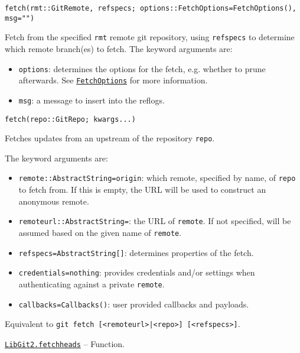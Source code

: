 \begin{adjustwidth}{2em}{0pt}


\begin{verbatim}
fetch(rmt::GitRemote, refspecs; options::FetchOptions=FetchOptions(), msg="")
\end{verbatim}

Fetch from the specified \texttt{rmt} remote git repository, using \texttt{refspecs} to determine which remote branch(es) to fetch. The keyword arguments are:

\begin{itemize}
\item \texttt{options}: determines the options for the fetch, e.g. whether to prune afterwards. See \hyperlink{7474664468985945267}{\texttt{FetchOptions}} for more information.


\item \texttt{msg}: a message to insert into the reflogs.

\end{itemize}



\begin{lstlisting}
fetch(repo::GitRepo; kwargs...)
\end{lstlisting}

Fetches updates from an upstream of the repository \texttt{repo}.

The keyword arguments are:

\begin{itemize}
\item \texttt{remote::AbstractString={\textquotedbl}origin{\textquotedbl}}: which remote, specified by name, of \texttt{repo} to fetch from. If this is empty, the URL will be used to construct an anonymous remote.


\item \texttt{remoteurl::AbstractString={\textquotedbl}{\textquotedbl}}: the URL of \texttt{remote}. If not specified, will be assumed based on the given name of \texttt{remote}.


\item \texttt{refspecs=AbstractString[]}: determines properties of the fetch.


\item \texttt{credentials=nothing}: provides credentials and/or settings when authenticating against a private \texttt{remote}.


\item \texttt{callbacks=Callbacks()}: user provided callbacks and payloads.

\end{itemize}
Equivalent to \texttt{git fetch [<remoteurl>|<repo>] [<refspecs>]}.



\end{adjustwidth}
\hypertarget{17606053504537858539}{}
\hyperlink{17606053504537858539}{\texttt{LibGit2.fetchheads}}  -- {Function.}

